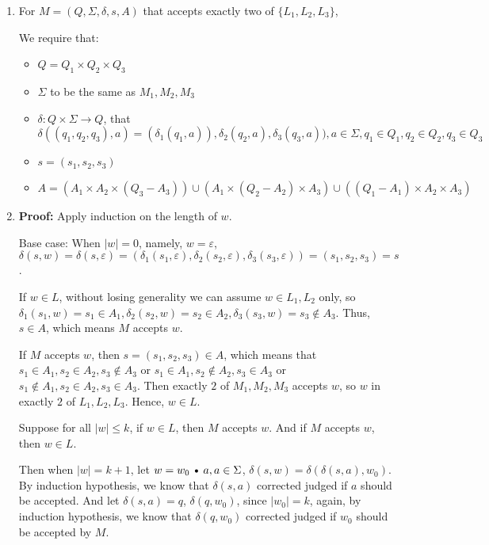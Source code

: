 \documentclass[11pt]{article}
\def\Cdot{\mathbin{\text{\normalfont \textbullet}}}
\begin{document}
\begin{solution}

	\begin{enumerate}
		\item For $M = (Q, \Sigma, \delta, s, A)$ that accepts exactly two of $\{L_1, L_2, L_3\}$,
			
			We require that:
				\begin{itemize}
					\item $Q = Q_1 \times Q_2 \times Q_3$
					\item $\Sigma$ to be the same as $M_1, M_2, M_3$
					\item $\delta: Q \times \Sigma \rightarrow Q$, that $\delta((q_1, q_2, q_3), a) = (\delta_1(q_1, a)), \delta_2(q_2, a), \delta_3(q_3, a)), a \in \Sigma, q_1 \in Q_1, q_2 \in Q_2, q_3 \in Q_3$
					\item $s = (s_1, s_2, s_3)$
					\item $A = (A_1 \times A_2 \times (Q_3 - A_3)) \cup  (A_1 \times (Q_2 - A_2) \times A_3) \cup ((Q_1 - A_1) \times A_2 \times A_3)$
				\end{itemize}
		\item \textbf{Proof:}
			Apply induction on the length of $w$.
			
			Base case: When $|w| = 0$, namely, $w = \varepsilon$, $\delta(s, w) = \delta(s, \varepsilon) = (\delta_1(s_1, \varepsilon), \delta_2(s_2, \varepsilon), \delta_3(s_3, \varepsilon)) = (s_1, s_2, s_3) = s$. 
			
			If $w \in L$, without losing generality we can assume $w \in L_1, L_2$ only, so $\delta_1(s_1, w) = s_1 \in A_1, \delta_2(s_2, w) = s_2 \in A_2, \delta_3(s_3, w) = s_3 \notin A_3$. Thus, $s \in A$, which means $M$ accepts $w$. 
			
			If $M$ accepts $w$, then $s = (s_1, s_2, s_3) \in A$, which means that $s_1 \in A_1, s_2 \in A_2, s_3 \notin A_3$ or $s_1 \in A_1, s_2 \notin A_2, s_3 \in A_3$ or $s_1 \notin A_1, s_2 \in A_2, s_3 \in A_3$. Then exactly $2$ of $M_1, M_2, M_3$ accepts $w$, so $w$ in exactly $2$ of $L_1, L_2, L_3$. Hence, $w \in L$.
			
			Suppose for all $|w| \leq k$, if $w \in L$, then $M$ accepts $w$. And if $M$ accepts $w$, then $w \in L$.
			
			Then when $|w| = k + 1$, let $w = w_0 \Cdot a, a\in \Sigma$, $\delta(s, w) = \delta(\delta(s, a), w_0)$. By induction hypothesis, we know that $\delta(s, a)$ corrected judged if $a$ should be accepted. And let $\delta(s, a) = q$, $\delta(q, w_0)$, since $|w_0| = k$, again, by induction hypothesis, we know that $\delta(q, w_0)$ corrected judged if $w_0$ should be accepted by $M$.
			

\end{enumerate}
\end{solution}
\end{document}
